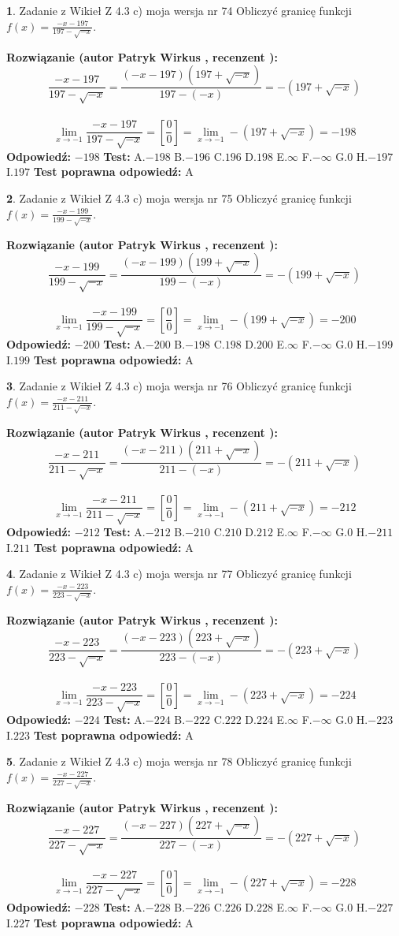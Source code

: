 \documentclass[12pt, a4paper]{article}
\theoremstyle{definition} %
\newtheorem{zad}{}
\newcommand{\zadStart}[1]{\begin{zad}#1\newline}
\newcommand{\zadStop}{\end{zad}}
\newcommand{\rozwStart}[2]{\noindent \textbf{Rozwiązanie (autor #1 , recenzent #2): }\newline}
\newcommand{\rozwStop}{\newline}
\newcommand{\odpStart}{\noindent \textbf{Odpowiedź:}\newline}
\newcommand{\odpStop}{\newline}
\newcommand{\testStart}{\noindent \textbf{Test:}\newline}
\newcommand{\testStop}{\newline}
\newcommand{\kluczStart}{\noindent \textbf{Test poprawna odpowiedź:}\newline}
\newcommand{\kluczStop}{\newline}
\begin{document}
\zadStart{Zadanie z Wikieł Z 4.3 c) moja wersja nr 74}
Obliczyć granicę funkcji $f(x)=\frac{-x-197}{197-\sqrt{-x}}$.
\zadStop
\rozwStart{Patryk Wirkus}{}
$$\frac{-x-197}{197-\sqrt{-x}}=\frac{(-x-197)(197+\sqrt{-x})}{197-(-x)}=-(197+\sqrt{-x})$$
\\
$$\lim\limits_{x\to-1}\frac{-x-197}{197-\sqrt{-x}}=[\frac{0}{0}]=\lim\limits_{x\to-1}-(197+\sqrt{-x}) =-198$$
\rozwStop
\odpStart
$-198$
\odpStop
\testStart
A.$-198$
B.$-196$
C.$196$
D.$198$
E.$\infty$
F.$-\infty$
G.$0$
H.$-197$
I.$197$
\testStop
\kluczStart
A
\kluczStop



\zadStart{Zadanie z Wikieł Z 4.3 c) moja wersja nr 75}
Obliczyć granicę funkcji $f(x)=\frac{-x-199}{199-\sqrt{-x}}$.
\zadStop
\rozwStart{Patryk Wirkus}{}
$$\frac{-x-199}{199-\sqrt{-x}}=\frac{(-x-199)(199+\sqrt{-x})}{199-(-x)}=-(199+\sqrt{-x})$$
\\
$$\lim\limits_{x\to-1}\frac{-x-199}{199-\sqrt{-x}}=[\frac{0}{0}]=\lim\limits_{x\to-1}-(199+\sqrt{-x}) =-200$$
\rozwStop
\odpStart
$-200$
\odpStop
\testStart
A.$-200$
B.$-198$
C.$198$
D.$200$
E.$\infty$
F.$-\infty$
G.$0$
H.$-199$
I.$199$
\testStop
\kluczStart
A
\kluczStop



\zadStart{Zadanie z Wikieł Z 4.3 c) moja wersja nr 76}
Obliczyć granicę funkcji $f(x)=\frac{-x-211}{211-\sqrt{-x}}$.
\zadStop
\rozwStart{Patryk Wirkus}{}
$$\frac{-x-211}{211-\sqrt{-x}}=\frac{(-x-211)(211+\sqrt{-x})}{211-(-x)}=-(211+\sqrt{-x})$$
\\
$$\lim\limits_{x\to-1}\frac{-x-211}{211-\sqrt{-x}}=[\frac{0}{0}]=\lim\limits_{x\to-1}-(211+\sqrt{-x}) =-212$$
\rozwStop
\odpStart
$-212$
\odpStop
\testStart
A.$-212$
B.$-210$
C.$210$
D.$212$
E.$\infty$
F.$-\infty$
G.$0$
H.$-211$
I.$211$
\testStop
\kluczStart
A
\kluczStop



\zadStart{Zadanie z Wikieł Z 4.3 c) moja wersja nr 77}
Obliczyć granicę funkcji $f(x)=\frac{-x-223}{223-\sqrt{-x}}$.
\zadStop
\rozwStart{Patryk Wirkus}{}
$$\frac{-x-223}{223-\sqrt{-x}}=\frac{(-x-223)(223+\sqrt{-x})}{223-(-x)}=-(223+\sqrt{-x})$$
\\
$$\lim\limits_{x\to-1}\frac{-x-223}{223-\sqrt{-x}}=[\frac{0}{0}]=\lim\limits_{x\to-1}-(223+\sqrt{-x}) =-224$$
\rozwStop
\odpStart
$-224$
\odpStop
\testStart
A.$-224$
B.$-222$
C.$222$
D.$224$
E.$\infty$
F.$-\infty$
G.$0$
H.$-223$
I.$223$
\testStop
\kluczStart
A
\kluczStop



\zadStart{Zadanie z Wikieł Z 4.3 c) moja wersja nr 78}
Obliczyć granicę funkcji $f(x)=\frac{-x-227}{227-\sqrt{-x}}$.
\zadStop
\rozwStart{Patryk Wirkus}{}
$$\frac{-x-227}{227-\sqrt{-x}}=\frac{(-x-227)(227+\sqrt{-x})}{227-(-x)}=-(227+\sqrt{-x})$$
\\
$$\lim\limits_{x\to-1}\frac{-x-227}{227-\sqrt{-x}}=[\frac{0}{0}]=\lim\limits_{x\to-1}-(227+\sqrt{-x}) =-228$$
\rozwStop
\odpStart
$-228$
\odpStop
\testStart
A.$-228$
B.$-226$
C.$226$
D.$228$
E.$\infty$
F.$-\infty$
G.$0$
H.$-227$
I.$227$
\testStop
\kluczStart
A
\kluczStop
\end{document}
